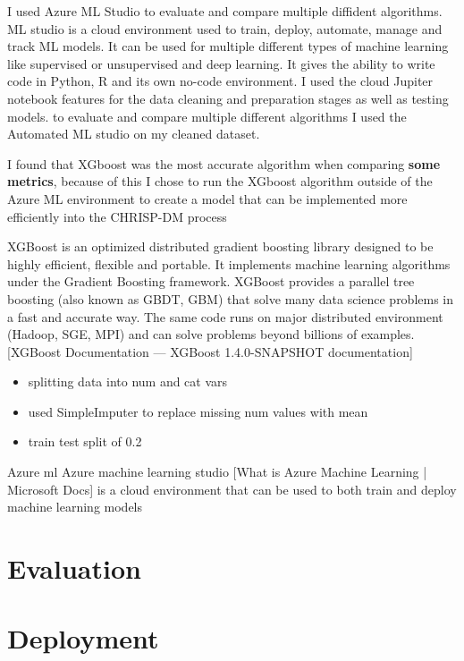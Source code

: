 I used Azure ML Studio to evaluate and compare multiple diffident algorithms. ML studio is a cloud environment used to train, deploy, automate, manage and track ML models. It can be used for multiple different types of machine learning like supervised or unsupervised and deep learning. It gives the ability to write code in Python, R and its own no-code environment.  I used the cloud Jupiter notebook features for the data cleaning and preparation stages as well as testing models. to evaluate and compare multiple different algorithms I used the Automated ML studio on my cleaned dataset.

I found that XGboost was the most accurate algorithm when comparing \textbf{some metrics}, because of this I chose to run the XGboost algorithm outside of the Azure ML environment to create a model that can be implemented more efficiently into the CHRISP-DM process

XGBoost is an optimized distributed gradient boosting library designed to be highly efficient, flexible and portable. It implements machine learning algorithms under the Gradient Boosting framework. XGBoost provides a parallel tree boosting (also known as GBDT, GBM) that solve many data science problems in a fast and accurate way. The same code runs on major distributed environment (Hadoop, SGE, MPI) and can solve problems beyond billions of examples. [XGBoost Documentation — XGBoost 1.4.0-SNAPSHOT documentation]

\begin{itemize}
\item splitting data into num and cat vars 
\item used SimpleImputer to replace missing num values with mean
\item train test split of 0.2
\end{itemize}

			 
Azure ml
Azure machine learning studio [What is Azure Machine Learning | Microsoft Docs] is a cloud environment that can be used to both train and deploy machine learning models 


\section{Evaluation}

\section{Deployment}



